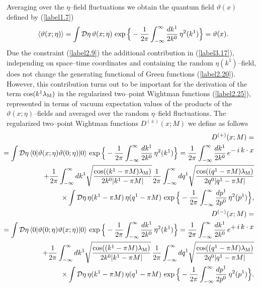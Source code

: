 \documentclass[a4paper,12pt] {article}
\begin{document}
Averaging over the $\eta$--field fluctuations we obtain the quantum
field $\vartheta(x)$ defined by (\ref{label1.7})
%
\begin{eqnarray}\label{label3.18}
\langle \vartheta(x;\eta)\rangle = \int{\cal
D}\eta\,\vartheta(x;\eta)\,\exp\Big\{-\frac{1}{2\pi}
\int^{\infty}_{-\infty}\frac{dk^1}{2k^0}\,\eta^2(k^1)\Big\}
= \vartheta(x).
\end{eqnarray}
%
Due the constraint (\ref{label2.9}) the additional contribution in
(\ref{label3.17}), independing on space--time coordinates and
containing the random $\eta(k^1)$--field, does not change the
generating functional of Green functions (\ref{label2.20}). However,
this contribution turns out to be important for the derivation of the
term $\cos(k^1\lambda_{\rm M})$ in the regularized two--point Wightman
functions (\ref{label2.25}), represented in terms of vacuum
expectation values of the products of the $\vartheta(x;\eta)$--fields
and averaged over the random $\eta$--field fluctuations. The
regularized two--point Wightman functions $D^{(\pm)}(x;M)$ we define
as follows
%
\begin{eqnarray}\label{label3.19}
\hspace{-0.3in}&&D^{(+)}(x;M)= \nonumber\\
\hspace{-0.3in}&&=\int{\cal D}\eta\,\langle
0|\vartheta(x;\eta)\vartheta(0;\eta)|0\rangle\,
\exp\Big\{-\frac{1}{2\pi} \int^{\infty}_{-\infty}\frac{dk^1}{2k^0}\,
\eta^2(k^1)\Big\}=\frac{1}{2\pi}\int^{\infty}_{-\infty}
\frac{dk^1}{2k^0}\,
e^{\textstyle -\,i\,k\cdot x}\nonumber\\
\hspace{-0.3in}&&+
\frac{1}{2\pi}\int^{\infty}_{-\infty}dk^1\sqrt{\frac{\cos((k^1 - \pi
M)\lambda_{\rm M})}{2k^0|k^1 - \pi M|}}
\frac{1}{2\pi}\int^{\infty}_{-\infty}dq^1\sqrt{\frac{\cos((q^1 - \pi
M)\lambda_{\rm M})}{2q^0|q^1 - \pi M|}}\nonumber\\
\hspace{-0.3in}&&\times\int{\cal D}\eta\,\eta(k^1 - \pi M)\, \eta(q^1
- \pi M )\,\exp\Big\{-\frac{1}{2\pi}
\int^{\infty}_{-\infty}\frac{dp^1}{2p^0}\,
\eta^2(p^1)\Big\},\nonumber\\ \hspace{-0.3in}&&D^{(-)}(x;M)= \nonumber\\
\hspace{-0.3in}&&=\int{\cal D}\eta\,\langle
0|\vartheta(0;\eta)\vartheta(x;\eta)|0\rangle\,
\exp\Big\{-\frac{1}{2\pi} \int^{\infty}_{-\infty}\frac{dk^1}{2k^0}\,
\eta^2(k^1)\Big\}= \frac{1}{2\pi}\int^{\infty}_{-\infty}
\frac{dk^1}{2k^0}\,e^{\textstyle +\,i\,k\cdot x}\nonumber\\
\hspace{-0.3in}&& +
\frac{1}{2\pi}\int^{\infty}_{-\infty}dk^1\sqrt{\frac{\cos((k^1 - \pi
M)\lambda_{\rm M})}{2k^0|k^1 - \pi M|}}\,\frac{1}{2\pi}
\int^{\infty}_{-\infty}dq^1\sqrt{\frac{\cos((q^1 - \pi M)\lambda_{\rm
M})}{2q^0|q^1 - \pi M|}}\nonumber\\
\hspace{-0.3in}&&\times\int{\cal D}\eta\,\eta(k^1 - \pi M)\, \eta(q^1
- \pi M)\,\exp\Big\{-\frac{1}{2\pi}
\int^{\infty}_{-\infty}\frac{dp^1}{2p^0}\, \eta^2(p^1)\Big\}.
\end{eqnarray}
\end{document}
